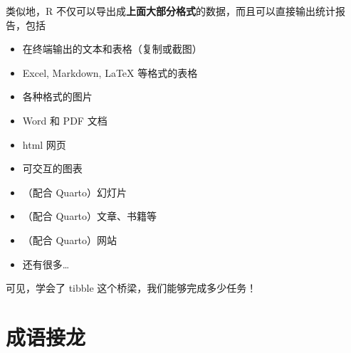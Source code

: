 \documentclass[
  letterpaper,
]{ctexbook}
\providecommand{\tightlist}{%
  \setlength{\itemsep}{0pt}\setlength{\parskip}{0pt}}\usepackage{longtable,booktabs,array}
\begin{document}
类似地，R
不仅可以导出成\textbf{上面大部分格式}的数据，而且可以直接输出统计报告，包括

\begin{itemize}
\tightlist
\item
  在终端输出的文本和表格（复制或截图）
\item
  Excel, Markdown, LaTeX 等格式的表格
\item
  各种格式的图片
\item
  Word 和 PDF 文档
\item
  html 网页
\item
  可交互的图表
\item
  （配合 Quarto）幻灯片
\item
  （配合 Quarto）文章、书籍等
\item
  （配合 Quarto）网站
\item
  还有很多\ldots{}
\end{itemize}

可见，学会了 tibble 这个桥梁，我们能够完成多少任务！

\hypertarget{sec-chengyu}{%
\section{成语接龙}\label{sec-chengyu}}
\end{document}
